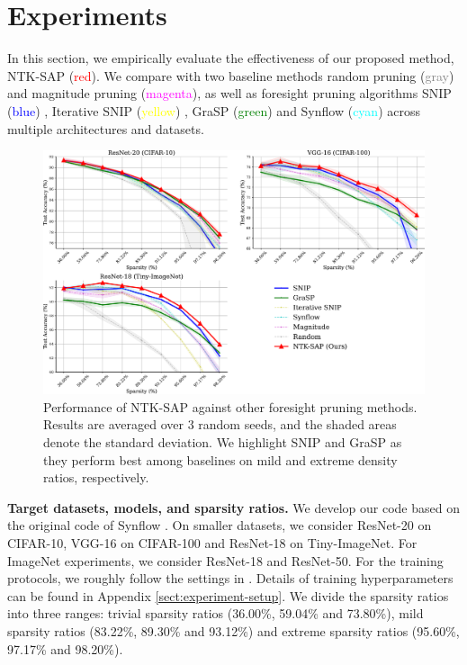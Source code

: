 \documentclass{article} %
\begin{document}
\section{Experiments} \label{sect:main-experiment}

In this section, we empirically evaluate the effectiveness of our proposed method, NTK-SAP (\textcolor{red}{red}). We compare with two baseline methods random pruning (\textcolor{gray}{gray}) and magnitude pruning (\textcolor{magenta}{magenta}), as well as foresight pruning algorithms SNIP (\textcolor{blue}{blue}) \citep{snip}, Iterative SNIP (\textcolor{yellow}{yellow}) \citep{force}, GraSP (\textcolor{green}{green}) \citep{grasp} and Synflow (\textcolor{cyan}{cyan}) \citep{synflow} across multiple architectures and datasets.

\begin{figure}[t]
  \centering
    \includegraphics[width=\textwidth]{plots/test_single_914_main.pdf}
   \caption{Performance of NTK-SAP against other foresight pruning methods. Results are averaged over 3 random seeds, and the shaded areas denote the standard deviation. We highlight SNIP and GraSP as they perform best among baselines on mild and extreme density ratios, respectively.}
   \label{fig:main-comparison}
\end{figure}


\textbf{Target datasets, models, and sparsity ratios.} We develop our code based on the original code of Synflow \citep{synflow}. On smaller datasets, we consider ResNet-20 \citep{resnet} on CIFAR-10, VGG-16 \citep{vgg} on CIFAR-100 \citep{cifar10} and ResNet-18 on Tiny-ImageNet. For ImageNet \citep{deng2009imagenet} experiments, we consider ResNet-18 and ResNet-50. For the training protocols, we roughly follow the settings in \citet{franklemissing}. Details of training hyperparameters can be found in Appendix \ref{sect:experiment-setup}. We divide the sparsity ratios into three ranges: trivial sparsity ratios (36.00\%, 59.04\% and 73.80\%), mild sparsity ratios (83.22\%, 89.30\% and 93.12\%) and extreme sparsity ratios (95.60\%, 97.17\% and 98.20\%). 
 
\end{document}
